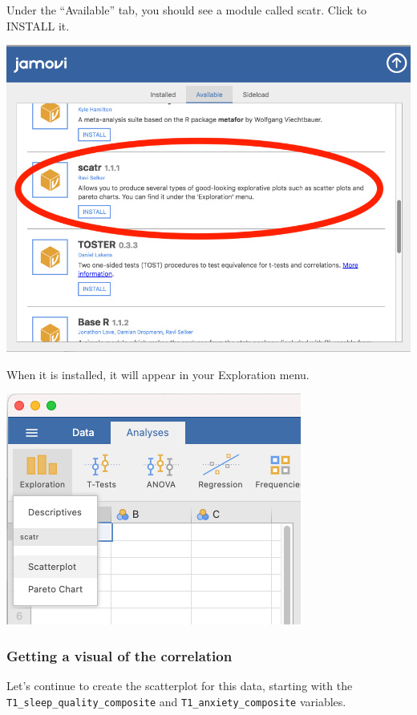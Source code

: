 \documentclass[
]{book}
\begin{document}
Under the ``Available'' tab, you should see a module called {scatr}. Click to {INSTALL} it.

\includegraphics{img/modules.png}

When it is installed, it will appear in your {Exploration} menu.

\includegraphics{img/scatr.png}

\hypertarget{getting-a-visual-of-the-correlation}{%
\subsubsection{Getting a visual of the correlation}\label{getting-a-visual-of-the-correlation}}

Let's continue to create the scatterplot for this data, starting with the \texttt{T1\_sleep\_quality\_composite} and \texttt{T1\_anxiety\_composite} variables.
\end{document}
